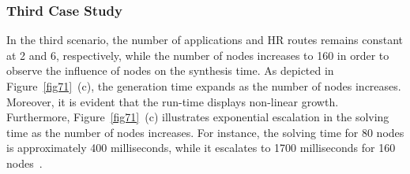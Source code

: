           
    \subsubsection{Third Case Study}
    In the third scenario, the number of applications and HR routes remains constant at 2 and 6, respectively, while the number of nodes increases to 160 in order to observe the influence of nodes on the synthesis time. As depicted in Figure~\ref{fig71}~(c), the generation time expands as the number of nodes increases. Moreover, it is evident that the run-time displays non-linear growth. Furthermore, Figure~\ref{fig71}~(c) illustrates exponential escalation in the solving time as the number of nodes increases. For instance, the solving time for 80 nodes is approximately 400 milliseconds, while it escalates to 1700 milliseconds for 160 nodes~\cite{9565115}.

         
     
